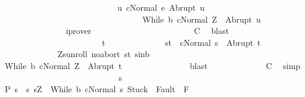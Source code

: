 \begin{isabellebody}
\ \ \ \ \ \ \ \ \ \ \ \ \ \ \ \ \ \ \ \ \ \ \ \ \ \ \ \ {\isacharparenleft}{\isasymforall}u{\isachardot}\ {\isasymGamma}{\isasymturnstile}{\isasymlangle}c{\isacharcomma}Normal\ e{\isasymrangle}\ {\isasymRightarrow}Abrupt\ u\ {\isasymlongrightarrow}\ \isanewline
\ \ \ \ \ \ \ \ \ \ \ \ \ \ \ \ \ \ \ \ \ \ \ \ \ \ \ \ \ \ \ \ \ \ {\isasymGamma}{\isasymturnstile}{\isasymlangle}While\ b\ c{\isacharcomma}Normal\ Z{\isasymrangle}\ {\isasymRightarrow}\ Abrupt\ u{\isacharparenright}{\isacharparenright}{\isachardoublequoteclose}\isanewline
\ \ \ \ \ \ \ \ \ \ \ \ \ \ \isamarkupfalse%
\ iprover\isanewline
\ \ \ \ \ \ \ \ \ \ \isacommand{{\isacharbraceright}}\isamarkupfalse%
\isanewline
\ \ \ \ \ \ \ \ \ \ \isamarkupfalse%
\ \isamarkupfalse%
\ {\isacharquery}C{}\ \isamarkupfalse%
\ blast\isanewline
\ \ \ \ \ \ \ \ \isamarkupfalse%
\isanewline
\ \ \ \ \ \ \ \ \ \ \isacommand{{\isacharbraceleft}}\isamarkupfalse%
\isanewline
\ \ \ \ \ \ \ \ \ \ \ \ \isamarkupfalse%
\ t\isanewline
\ \ \ \ \ \ \ \ \ \ \ \ \isamarkupfalse%
\ s{\isacharunderscore}t{\isacharcolon}\ \ {\isachardoublequoteopen}{\isasymGamma}{\isasymturnstile}{\isasymlangle}c{\isacharcomma}Normal\ s{\isasymrangle}\ {\isasymRightarrow}\ Abrupt\ t{\isachardoublequoteclose}\ \isanewline
\ \ \ \ \ \ \ \ \ \ \ \ \isamarkupfalse%
\ Z{\isacharunderscore}s{\isacharunderscore}unroll\ noabort\ s{\isacharunderscore}t\ s{\isacharunderscore}in{\isacharunderscore}b\ \isanewline
\ \ \ \ \ \ \ \ \ \ \ \ \isamarkupfalse%
\ {\isachardoublequoteopen}{\isasymGamma}{\isasymturnstile}{\isasymlangle}While\ b\ c{\isacharcomma}Normal\ Z{\isasymrangle}\ {\isasymRightarrow}\ Abrupt\ t{\isachardoublequoteclose}\isanewline
\ \ \ \ \ \ \ \ \ \ \ \ \ \ \isamarkupfalse%
\ blast\isanewline
\ \ \ \ \ \ \ \ \ \ \isacommand{{\isacharbraceright}}\isamarkupfalse%
\ \isamarkupfalse%
\ {\isacharquery}C{}\ \isamarkupfalse%
\ simp\isanewline
\ \ \ \ \ \ \ \ \isamarkupfalse%
\isanewline
\ \ \ \ \ \ \isamarkupfalse%
\isanewline
\ \ \ \ \isamarkupfalse%
\isanewline
\ \ \isamarkupfalse%
\isanewline
\ \ \ \ \isamarkupfalse%
\ s\isanewline
\ \ \ \ \isamarkupfalse%
\ P{\isacharcolon}\ {\isachardoublequoteopen}s\ {\isasymin}\ {\isacharbraceleft}s{\isachardot}\ s{\isacharequal}Z\ {\isasymand}\ {\isasymGamma}{\isasymturnstile}{\isasymlangle}While\ b\ c{\isacharcomma}Normal\ s{\isasymrangle}\ {\isasymRightarrow}{\isasymnotin}{\isacharparenleft}{\isacharbraceleft}Stuck{\isacharbraceright}\ {\isasymunion}\ Fault\ {\isacharbackquote}\ {\isacharparenleft}{\isacharminus}F{\isacharparenright}{\isacharparenright}{\isacharbraceright}{\isachardoublequoteclose}\isanewline

\end{isabellebody}
